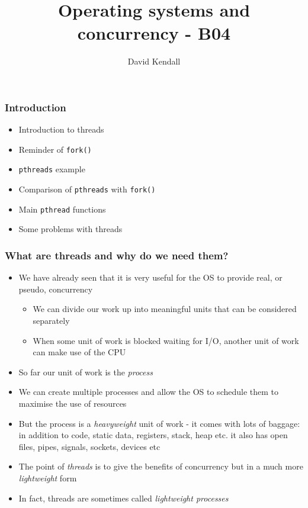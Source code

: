\documentclass[hyperref={pdfpagelabels=false},svgnames]{beamer}
\title{Operating systems and concurrency - B04}
\subtitle{}
\author{David Kendall}
\institute{Northumbria University}
\date{}
\begin{document}
\begin{frame}
\titlepage
\end{frame}

\begin{frame}
\frametitle{Introduction}
\begin{itemize}
  \item Introduction to threads
  \item Reminder of \texttt{fork()}
  \item \texttt{pthreads} example
  \item Comparison of \texttt{pthreads} with \texttt{fork()}
  \item Main \texttt{pthread} functions
  \item Some problems with threads
\end{itemize}
\end{frame}

\begin{frame}
  \frametitle{What are threads and why do we need them?}
  \begin{itemize}
    \item We have already seen that it is very useful for the OS
      to provide real, or pseudo, concurrency
      \begin{itemize}
        \item We can divide our work up into meaningful units that can
          be considered separately
        \item When some unit of work is blocked waiting for I/O, another unit
          of work can make use of the CPU
      \end{itemize}
    \item So far our unit of work is the \emph{process}
    \item We can create multiple processes and allow the OS to schedule them to 
      maximise the use of resources
    \item But the process is a \emph{heavyweight} unit of work - it comes with
      lots of baggage: in addition to code, static data, registers, stack, heap 
      etc. it also has open files, pipes, signals, sockets, devices etc
    \item The point of \emph{threads} is to give the benefits of concurrency
      but in a much more \emph{lightweight} form
    \item In fact, threads are sometimes called \emph{lightweight processes}
  \end{itemize}
\end{frame}
\end{document}

